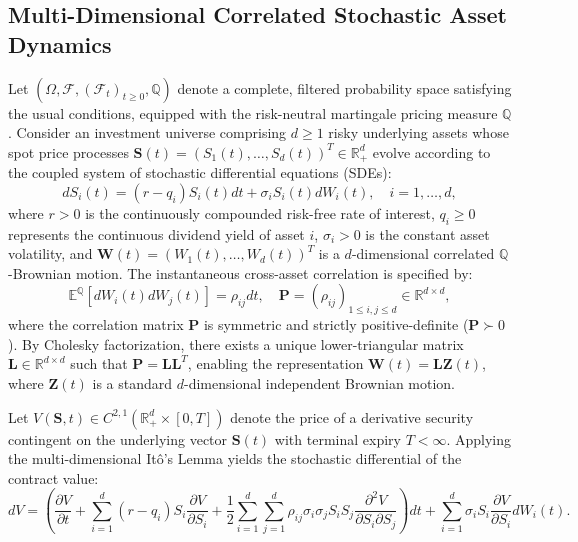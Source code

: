 \documentclass[11pt,a4paper]{article}
\begin{document}
\subsection{Multi-Dimensional Correlated Stochastic Asset Dynamics}
Let $(\Omega, \mathcal{F}, (\mathcal{F}_t)_{t \ge 0}, \mathbb{Q})$ denote a complete, filtered probability space satisfying the usual conditions, equipped with the risk-neutral martingale pricing measure $\mathbb{Q}$. Consider an investment universe comprising $d \ge 1$ risky underlying assets whose spot price processes $\mathbf{S}(t) = (S_1(t), \dots, S_d(t))^T \in \mathbb{R}_+^d$ evolve according to the coupled system of stochastic differential equations (SDEs):
\begin{equation}
\label{eq:sde_system}
dS_i(t) = (r - q_i) S_i(t) dt + \sigma_i S_i(t) dW_i(t), \quad i = 1, \dots, d,
\end{equation}
where $r > 0$ is the continuously compounded risk-free rate of interest, $q_i \ge 0$ represents the continuous dividend yield of asset $i$, $\sigma_i > 0$ is the constant asset volatility, and $\mathbf{W}(t) = (W_1(t), \dots, W_d(t))^T$ is a $d$-dimensional correlated $\mathbb{Q}$-Brownian motion. The instantaneous cross-asset correlation is specified by:
\begin{equation}
\label{eq:correlation_structure}
\mathbb{E}^\mathbb{Q}\left[ dW_i(t) dW_j(t) \right] = \rho_{ij} dt, \quad \mathbf{P} = (\rho_{ij})_{1 \le i, j \le d} \in \mathbb{R}^{d \times d},
\end{equation}
where the correlation matrix $\mathbf{P}$ is symmetric and strictly positive-definite ($\mathbf{P} \succ 0$). By Cholesky factorization, there exists a unique lower-triangular matrix $\mathbf{L} \in \mathbb{R}^{d \times d}$ such that $\mathbf{P} = \mathbf{L} \mathbf{L}^T$, enabling the representation $\mathbf{W}(t) = \mathbf{L} \mathbf{Z}(t)$, where $\mathbf{Z}(t)$ is a standard $d$-dimensional independent Brownian motion.

Let $V(\mathbf{S}, t) \in C^{2, 1}\left(\mathbb{R}_+^d \times [0, T]\right)$ denote the price of a derivative security contingent on the underlying vector $\mathbf{S}(t)$ with terminal expiry $T < \infty$. Applying the multi-dimensional It\^o's Lemma yields the stochastic differential of the contract value:
\begin{equation}
\label{eq:ito_expansion}
dV = \left( \frac{\partial V}{\partial t} + \sum_{i=1}^d (r - q_i) S_i \frac{\partial V}{\partial S_i} + \frac{1}{2}\sum_{i=1}^d \sum_{j=1}^d \rho_{ij} \sigma_i \sigma_j S_i S_j \frac{\partial^2 V}{\partial S_i \partial S_j} \right) dt + \sum_{i=1}^d \sigma_i S_i \frac{\partial V}{\partial S_i} dW_i(t).
\end{equation}
\end{document}
